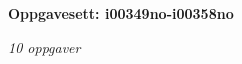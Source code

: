 \centerline{\bf Oppgavesett: i00349no-i00358no}
\vskip 10pt
\centerline{\it 10 oppgaver}\vskip 10pt
\vskip 10pt
